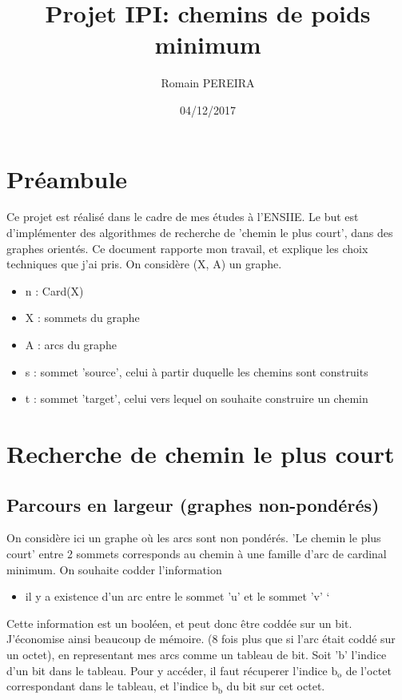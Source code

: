 \documentclass[a4paper,10pt]{article}
\title{Projet IPI: chemins de poids minimum}
\author{Romain PEREIRA}
\date{04/12/2017}
\begin{document}
  \maketitle
  \tableofcontents

  \section*{Préambule}
    Ce projet est réalisé dans le cadre de mes études à l'ENSIIE.\newline
    Le but est d'implémenter des algorithmes de recherche de 'chemin le plus court', dans des graphes orientés.\newline
    Ce document rapporte mon travail, et explique les choix techniques que j'ai pris.\newline\newline
    On considère (X, A) un graphe.
    \begin{itemize}[label=-]
      \item n : Card(X)
      \item X : sommets du graphe
      \item A : arcs du graphe
      \item s : sommet 'source', celui à partir duquelle les chemins sont construits
      \item t : sommet 'target', celui vers lequel on souhaite construire un chemin
    \end{itemize}
    
  \newpage
  \section{Recherche de chemin le plus court}
  \subsection{Parcours en largeur (graphes non-pondérés)}
    On considère ici un graphe où les arcs sont non pondérés.\newline
    'Le chemin le plus court' entre 2 sommets corresponds au chemin à une famille d'arc de cardinal minimum.\newline
    On souhaite codder l'information
    \begin{itemize}[label=-]
      \item il y a existence d'un arc entre le sommet 'u' et le sommet 'v' `
    \end{itemize}
    Cette information est un booléen, et peut donc être coddée sur un bit.
    J'économise ainsi beaucoup de mémoire. (8 fois plus que si l'arc était coddé sur un octet),
    en representant mes arcs comme un tableau de bit.\newline\newline
    Soit 'b' l'indice d'un bit dans le tableau.
    Pour y accéder, il faut récuperer l'indice $\textrm{b}_\textrm{o}$ de l'octet correspondant dans le tableau,
    et l'indice $\textrm{b}_\textrm{b}$ du bit sur cet octet.\newline
    
\end{document}
